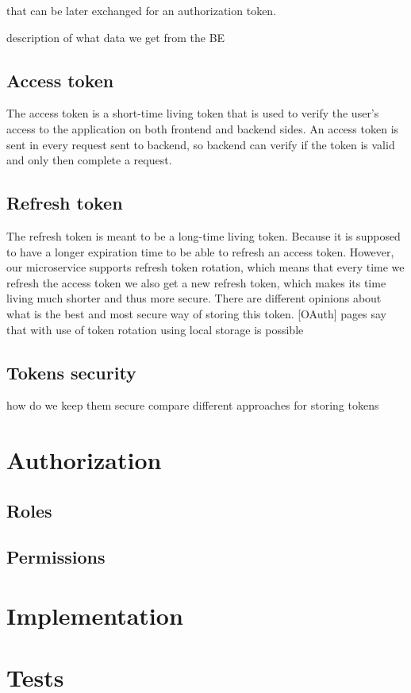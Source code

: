 that can be later exchanged for an authorization token. 





description of what data we get from the BE

\subsection{Access token}
The access token is a short-time living token that is used to verify the user's access to the application on both frontend and backend sides. An access token is sent in every request sent to backend, so backend can verify if the token is valid and only then complete a request.

\subsection{Refresh token}
The refresh token is meant to be a long-time living token. Because it is supposed to have a longer expiration time to be able to refresh an access token.
However, our microservice supports refresh token rotation, which means that every time we refresh the access token we also get a new refresh token, which makes its time living much shorter and thus more secure. There are different opinions about what is the best and most secure way of storing this token. [OAuth] pages say that with use of token rotation using local storage is possible

\subsection{Tokens security}
how do we keep them secure
compare different approaches for storing tokens


\section{Authorization}\label{sec:authorization}

\subsection{Roles}

\subsection{Permissions}


\section{Implementation}

\section{Tests}






